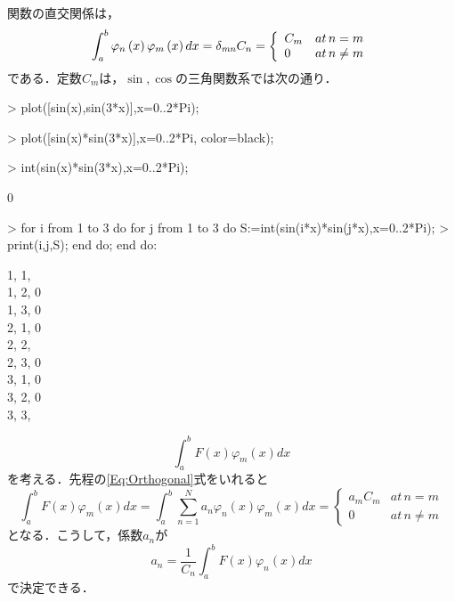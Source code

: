 関数の直交関係は，
\begin{equation}
\int _{a}^{b}\varphi _{{n}} \left( x \right) \varphi _{{m}} \left( x \right) {dx}=\delta_{{{\it mn}}}C_{{n}}= 
\left\{\begin{array}{lr}
C_m & at\, n=m \\
0 & at\, n\neq m
\end{array}\right.
\label{Eq:Orthogonal}
\end{equation}
である．定数$C_m$は，$\sin,\cos$の三角関数系では次の通り．
\begin{MapleInput}
> plot([sin(x),sin(3*x)],x=0..2*Pi);
\end{MapleInput}

\begin{MapleInput}
> plot([sin(x)*sin(3*x)],x=0..2*Pi, color=black);
\end{MapleInput}

\begin{MapleInput}
> int(sin(x)*sin(3*x),x=0..2*Pi);
\end{MapleInput}
\begin{MapleOutput}
0
\end{MapleOutput}
\begin{MapleInput}
> for i from 1 to 3 do for j from 1 to 3 do S:=int(sin(i*x)*sin(j*x),x=0..2*Pi);
> print(i,j,S); end do; end do:
\end{MapleInput}
\begin{MapleOutputGather}
1, 1, \pi \notag \\
1, 2, 0 \notag \\
1, 3, 0 \notag \\
2, 1, 0 \notag \\
2, 2, \pi \notag \\
2, 3, 0 \notag \\
3, 1, 0 \notag \\
3, 2, 0 \notag \\
3, 3, \pi \notag
\end{MapleOutputGather}
\begin{equation*}
\int _{a}^{b}F \left( x \right) \varphi _{{m}} \left( x \right) {dx}
\end{equation*}
を考える．先程の\ref{Eq:Orthogonal}式をいれると
\begin{equation}
\int _{a }^{b }F \left(x \right)\varphi _{m }\left(x \right) dx =\int _{a }^{b }{\sum^N_{n=1} }a _{n }\varphi _{n }\left(x \right)\varphi _{m }\left(x \right)d x = 
\left\{\begin{array}{lr}
a_m C_m & at\, n=m \\
0 & at\, n\neq m
\end{array}\right.
\end{equation}
となる．こうして，係数$a_n$が
\begin{equation*}
a_{{n}}=\frac {1}{C_n}\int _{a}^{b} F \left( x \right) \varphi _{{n}} \left( x \right) {dx}
\end{equation*}
で決定できる．
